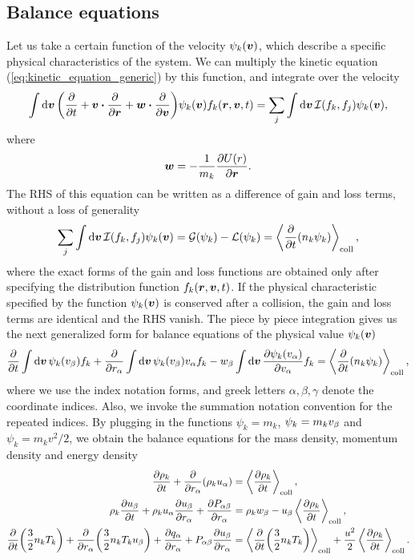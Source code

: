 \documentclass[aps,prl,preprint,groupedaddress,10pt]{revtex4-2}
\begin{document}
\subsection{Balance equations}
Let us take a certain function of the velocity $\psi_k(\vb*{v})$, which describe a specific physical
characteristics of the system. We can multiply the kinetic equation (\ref{eq:kinetic_equation_generic})
by this function, and integrate over the velocity
\begin{equation}
    \int\dd{\bv}\pqty{\pdv{t}+\bv\vdot\pdv{\br}+\bw\vdot\pdv{\bv}}
    \psi_k(\bv)f_k\pqty{\br,\bv,t}=\sum_{j}\int\dd{\bv}\mathcal{I}\pqty{f_k,f_j}\psi_k(\bv),
\end{equation}
where
\begin{equation}
    \vb*{w} = -\frac{1}{m_k}\pdv{U(r)}{\vb*{r}}.
\end{equation}
The RHS of this equation can be written as a difference of gain and loss terms, without a loss
of generality
\begin{equation}
    \sum_{j}\int\dd{\bv}\mathcal{I}\pqty{f_k,f_j}\psi_k(\bv)=\mathcal{G}(\psi_k)-\mathcal{L}(\psi_k)=
    \ltx{\avg{\pdv{t}\pqty{n_k\psi_k}}}{coll},
\end{equation}
where the exact forms of the gain and loss functions are obtained only after specifying the
distribution function $f_k\pqty{\br,\bv,t}$. If the physical characteristic specified by the function
$\psi_k(\vb*{v})$ is conserved after a collision, the gain and loss terms are identical and the RHS
vanish. The piece by piece integration gives us the next generalized form for balance equations
of the physical value $\psi_k(\vb*{v})$
\begin{equation}
    \pdv{t}\int\dd{\bv}\psi_k\pqty{\ib{v}}f_k+
    \pdv{\ia{r}}\int\dd{\bv}\psi_k\pqty{\ib{v}}\ia{v}f_k-
    \ib{w}\int\dd{\bv}\pdv{\psi_k\pqty{\ia{v}}}{\ia{v}}f_k=
    \ltx{\avg{\pdv{t}\pqty{n_k\psi_k}}}{coll},
\end{equation}
where we use the index notation forms, and greek letters $\alpha,\beta,\gamma$ denote the
coordinate indices. Also, we invoke the summation notation convention for the repeated indices.
By plugging in the functions $\psi_k=m_k$, $\psi_k=m_k{v}_{\beta}$ and $\psi_k=m_kv^2/2$, we obtain
the balance equations for the mass density, momentum density and energy density
\begin{equation}
    \begin{split}
        \pdv{\rho_k}{t}+\pdv{\ia{r}}\pqty{\rho_k\ia{u}} &=\ltx{\avg{\pdv{\rho_k}{t}}}{coll},\\
        \rho_k\pdv{\ib{u}}{t}+\rho_k\ia{u}\pdv{\ib{u}}{\ia{r}}+\pdv{\iab{P}}{\ia{r}}&=
        \rho_k\ib{w}-\ib{u}\ltx{\avg{\pdv{\rho_k}{t}}}{coll},\\
        \pdv{t}\pqty{\frac{3}{2}n_kT_k}+\pdv{\ia{r}}\pqty{\frac{3}{2}n_kT_k\ib{u}}+
        \pdv{\ia{q}}{\ia{r}}+\iab{P}\pdv{\ib{u}}{\ia{r}}&=
        \ltx{\avg{\pdv{t}\pqty{\frac{3}{2}n_kT_k}}}{coll}+
        \frac{u^2}{2}\ltx{\avg{\pdv{\rho_k}{t}}}{coll}.
    \end{split}
\end{equation}
\end{document}
